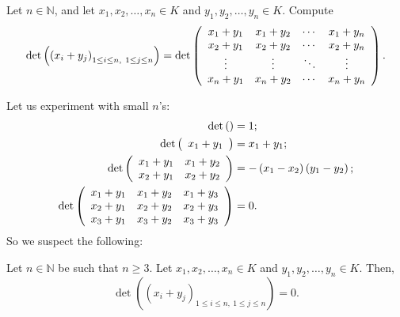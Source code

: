\begin{example}
Let $n\in\mathbb{N}$, and let $x_{1},x_{2},\ldots,x_{n}\in K$ and $y_{1}%
,y_{2},\ldots,y_{n}\in K$. Compute%
\[
\det\left(  \left(  x_{i}+y_{j}\right)  _{1\leq i\leq n,\ 1\leq j\leq
n}\right)  =\det\left(
\begin{array}
[c]{cccc}%
x_{1}+y_{1} & x_{1}+y_{2} & \cdots & x_{1}+y_{n}\\
x_{2}+y_{1} & x_{2}+y_{2} & \cdots & x_{2}+y_{n}\\
\vdots & \vdots & \ddots & \vdots\\
x_{n}+y_{1} & x_{n}+y_{2} & \cdots & x_{n}+y_{n}%
\end{array}
\right)  .
\]

\end{example}

Let us experiment with small $n$'s:%
\begin{align*}
\det\left(  {}\right)   &  =1;\\
\det\left(
\begin{array}
[c]{c}%
x_{1}+y_{1}%
\end{array}
\right)   &  =x_{1}+y_{1};\\
\det\left(
\begin{array}
[c]{cc}%
x_{1}+y_{1} & x_{1}+y_{2}\\
x_{2}+y_{1} & x_{2}+y_{2}%
\end{array}
\right)   &  =-\left(  x_{1}-x_{2}\right)  \left(  y_{1}-y_{2}\right)  ;\\
\det\left(
\begin{array}
[c]{ccc}%
x_{1}+y_{1} & x_{1}+y_{2} & x_{1}+y_{3}\\
x_{2}+y_{1} & x_{2}+y_{2} & x_{2}+y_{3}\\
x_{3}+y_{1} & x_{3}+y_{2} & x_{3}+y_{3}%
\end{array}
\right)   &  =0.
\end{align*}
So we suspect the following:

\begin{proposition}
\label{prop.det.xi+yj}Let $n\in\mathbb{N}$ be such that $n\geq3$. Let
$x_{1},x_{2},\ldots,x_{n}\in K$ and $y_{1},y_{2},\ldots,y_{n}\in K$. Then,%
\[
\det\left(  \left(  x_{i}+y_{j}\right)  _{1\leq i\leq n,\ 1\leq j\leq
n}\right)  =0.
\]

\end{proposition}

